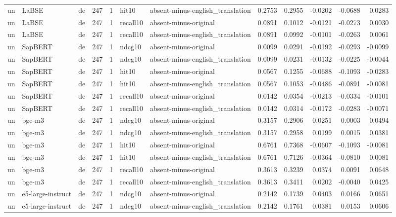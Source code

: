\begin{tabular}{lllrrllrrrrr}
un & LaBSE & de & 247 & 1 & hit10 & absent-minus-english\_translation & 0.2753 & 0.2955 & -0.0202 & -0.0688 & 0.0283 \\
un & LaBSE & de & 247 & 1 & recall10 & absent-minus-original & 0.0891 & 0.1012 & -0.0121 & -0.0273 & 0.0030 \\
un & LaBSE & de & 247 & 1 & recall10 & absent-minus-english\_translation & 0.0891 & 0.0992 & -0.0101 & -0.0263 & 0.0061 \\
un & SapBERT & de & 247 & 1 & ndcg10 & absent-minus-original & 0.0099 & 0.0291 & -0.0192 & -0.0293 & -0.0099 \\
un & SapBERT & de & 247 & 1 & ndcg10 & absent-minus-english\_translation & 0.0099 & 0.0231 & -0.0132 & -0.0225 & -0.0044 \\
un & SapBERT & de & 247 & 1 & hit10 & absent-minus-original & 0.0567 & 0.1255 & -0.0688 & -0.1093 & -0.0283 \\
un & SapBERT & de & 247 & 1 & hit10 & absent-minus-english\_translation & 0.0567 & 0.1053 & -0.0486 & -0.0891 & -0.0081 \\
un & SapBERT & de & 247 & 1 & recall10 & absent-minus-original & 0.0142 & 0.0354 & -0.0213 & -0.0334 & -0.0101 \\
un & SapBERT & de & 247 & 1 & recall10 & absent-minus-english\_translation & 0.0142 & 0.0314 & -0.0172 & -0.0283 & -0.0071 \\
un & bge-m3 & de & 247 & 1 & ndcg10 & absent-minus-original & 0.3157 & 0.2906 & 0.0251 & 0.0003 & 0.0494 \\
un & bge-m3 & de & 247 & 1 & ndcg10 & absent-minus-english\_translation & 0.3157 & 0.2958 & 0.0199 & 0.0015 & 0.0381 \\
un & bge-m3 & de & 247 & 1 & hit10 & absent-minus-original & 0.6761 & 0.7368 & -0.0607 & -0.1093 & -0.0081 \\
un & bge-m3 & de & 247 & 1 & hit10 & absent-minus-english\_translation & 0.6761 & 0.7126 & -0.0364 & -0.0810 & 0.0081 \\
un & bge-m3 & de & 247 & 1 & recall10 & absent-minus-original & 0.3613 & 0.3239 & 0.0374 & 0.0091 & 0.0648 \\
un & bge-m3 & de & 247 & 1 & recall10 & absent-minus-english\_translation & 0.3613 & 0.3411 & 0.0202 & -0.0040 & 0.0425 \\
un & e5-large-instruct & de & 247 & 1 & ndcg10 & absent-minus-original & 0.2142 & 0.1739 & 0.0403 & 0.0166 & 0.0651 \\
un & e5-large-instruct & de & 247 & 1 & ndcg10 & absent-minus-english\_translation & 0.2142 & 0.1761 & 0.0381 & 0.0153 & 0.0606 \\

\end{tabular}
